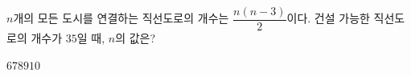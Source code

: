 $n$개의 모든 도시를 연결하는 직선도로의 개수는 $\dfrac{n(n-3)}{2}$이다. 건설 가능한 직선도로의 개수가 $35$일 때, $n$의 값은? 
\begin{choices32}{$6$}{$7$}{$8$}{$9$}{$10$}\end{choices32}
